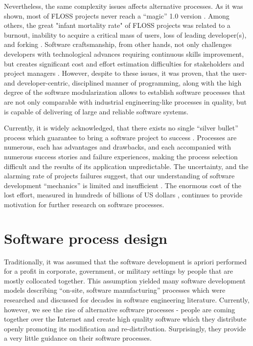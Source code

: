 Nevertheless, the same complexity issues affects alternative processes.
As it was shown, most of FLOSS projects never reach a ``magic'' 1.0 version \cite{citeulike:12480029}. 
Among others, the great "infant mortality rate" of FLOSS projects was related to a burnout, 
inability to acquire a critical mass of users, loss of leading developer(s), and forking \cite{richter2007critique}. 
Software craftsmanship, from other hands, not only challenges developers with technological advances 
requiring continuous skills improvement, but creates significant cost and effort estimation difficulties for
stakeholders and project managers \cite{citeulike:11058784}. However, despite to these issues, 
it was proven, that the user- and developer-centric, disciplined manner of programming, along with the high 
degree of the software modularization allows to establish software processes that are not only comparable 
with industrial engineering-like processes in quality, but is capable of delivering of large and 
reliable software systems.

Currently, it is widely acknowledged, that there exists no single ``silver bullet'' process which 
guarantee to bring a software project to success \cite{citeulike:1986013}. 
Processes are numerous, each has advantages and drawbacks, and each accompanied with 
numerous success stories and failure experiences, making the process selection difficult 
and the results of its application unpredictable.
The uncertainty, and the alarming rate of projects failures suggest, that our understanding 
of software development ``mechanics'' is limited and insufficient \cite{citeulike:12550665}. 
The enormous cost of the lost effort, measured in hundreds of billions of US dollars 
\cite{citeulike:2207657} \cite{citeulike:2207653} \cite{citeulike:2207655}, 
continues to provide motivation for further research on software processes. 

%
%
\section{Software process design}\label{section_software_process_design}
Traditionally, it was assumed that the software development is apriori performed for a profit 
in corporate, government, or military settings by people that are mostly collocated 
together. This assumption yielded many software development models describing 
``on-site, software manufacturing'' processes which were researched and discussed 
for decades in software  engineering literature. 
Currently, however, we see the rise of alternative software processes - people are coming 
together over the Internet and create high quality software which they distribute openly 
promoting its modification and re-distribution. Surprisingly, they provide a very little 
guidance on their software processes. 

